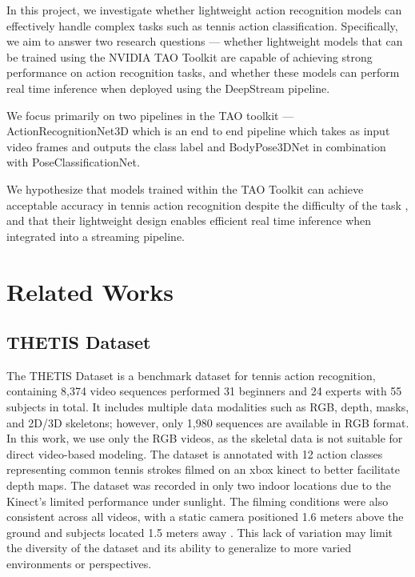 \documentclass[pdflatex,sn-mathphys-num]{sn-jnl}%
\theoremstyle{thmstyleone}%
\theoremstyle{thmstyletwo}%
\theoremstyle{thmstylethree}%
\begin{document}
In this project, we investigate whether lightweight action recognition models can effectively handle complex tasks such as tennis action classification. Specifically, we aim to answer two research questions --- whether lightweight models that can be trained using the NVIDIA TAO Toolkit are capable of achieving strong performance on action recognition tasks, and whether these models can perform real time inference when deployed using the DeepStream pipeline.

We focus primarily on two pipelines in the TAO toolkit --- ActionRecognitionNet3D which is an end to end pipeline which takes as input video frames and outputs the class label and BodyPose3DNet in combination with PoseClassificationNet. 

We hypothesize that models trained within the TAO Toolkit can achieve acceptable accuracy in tennis action recognition despite the difficulty of the task \cite{thetis}, and that their lightweight design enables efficient real time inference when integrated into a streaming pipeline.




\section{Related Works}\label{sec2}


\subsection{THETIS Dataset}

The THETIS Dataset is a benchmark dataset for tennis action recognition, containing 8,374 video sequences performed 31 beginners and 24 experts with 55 subjects in total\cite{thetis}. It includes multiple data modalities such as RGB, depth, masks, and 2D/3D skeletons; however, only 1,980 sequences are available in RGB format\cite{thetis}. In this work, we use only the RGB videos, as the skeletal data is not suitable for direct video-based modeling. The dataset is annotated with 12 action classes representing common tennis strokes filmed on an xbox kinect to better facilitate depth maps\cite{thetis}. The dataset was recorded in only two indoor locations due to the Kinect’s limited performance under sunlight. The filming conditions were also consistent across all videos, with a static camera positioned 1.6 meters above the ground and subjects located 1.5 meters away \cite{thetis}. This lack of variation may limit the diversity of the dataset and its ability to generalize to more varied environments or perspectives.
\end{document}
